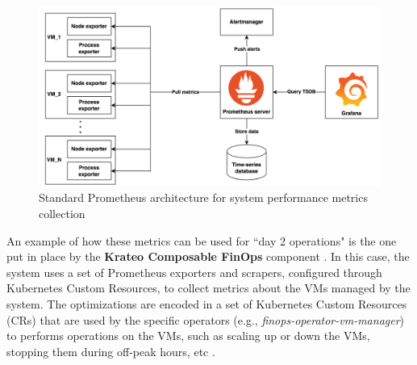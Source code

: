 \begin{figure}[t]
  \centering
  \includegraphics[width=1\linewidth]{images/prometheus.png}
  \caption{Standard Prometheus architecture for system performance metrics collection}
  \label{fig:prometheus}
\end{figure}

An example of how these metrics can be used for ``day 2 operations" is the one put in place by the \textbf{Krateo Composable FinOps} component \cite{krateo_docs}.
In this case, the system uses a set of Prometheus exporters and scrapers, configured through Kubernetes Custom Resources, to collect metrics about the VMs managed by the system.
The optimizations are encoded in a set of Kubernetes Custom Resources (CRs) that are used by the specific operators (e.g., \textit{finops-operator-vm-manager}) to performs operations on the VMs, such as scaling up or down the VMs, stopping them during off-peak hours, etc \cite{krateo_docs}.
\newline

